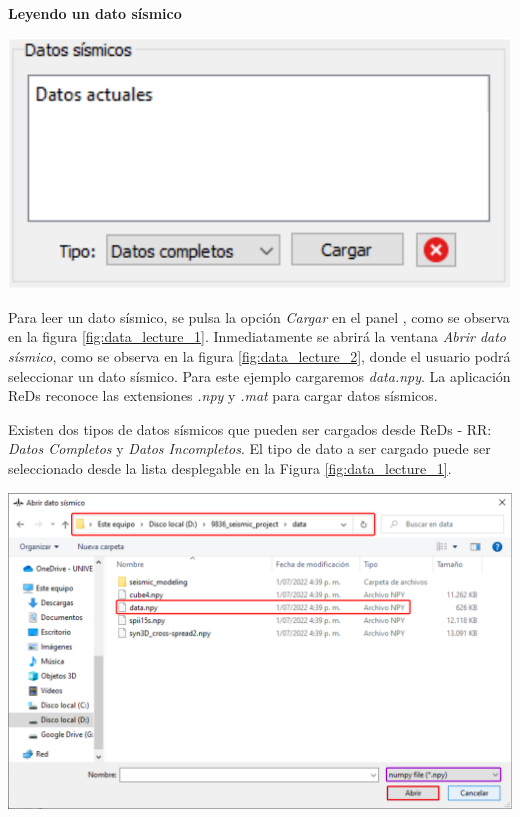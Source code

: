 \documentclass[12pt,twoside,letter]{ol-softwaremanual}
\newcommand*\circled[1]{\tikz[baseline=(char.base)]{
            \node[shape=circle,draw,inner sep=2pt] (char) {#1};}}
\newenvironment{Figure}
  {\par\medskip\noindent\minipage{\linewidth}}
  {\endminipage\par\medskip}
\begin{document}
\textbf{Leyendo un dato sísmico} \label{sec:data_lecture}

\begin{multicols}{2}
	
\begin{Figure}
	\centering
	\includegraphics[width=.9\linewidth]{data-lecture-1.pdf}
	\label{fig:data_lecture_1}
\end{Figure}

Para leer un dato sísmico, se pulsa la opción \emph{Cargar} en el panel \circled{2}, como se observa en la figura \ref{fig:data_lecture_1}. Inmediatamente se abrirá la ventana \textit{Abrir dato sísmico}, como se observa en la figura \ref{fig:data_lecture_2}, donde el usuario podrá seleccionar un dato sísmico. Para este ejemplo cargaremos \emph{data.npy}.
La aplicación ReDs reconoce las extensiones \emph{.npy} y \emph{.mat} para cargar datos sísmicos.

\end{multicols}

Existen dos tipos de datos sísmicos que pueden ser cargados desde ReDs - RR: \textit{Datos Completos} y \textit{Datos Incompletos}. El tipo de dato a ser cargado puede ser seleccionado desde la lista desplegable en la Figura \ref{fig:data_lecture_1}.

\begin{Figure}
    \centering
    \includegraphics[width=1\linewidth]{data-lecture-2.png}
    \label{fig:data_lecture_2}
\end{Figure}
\end{document}
